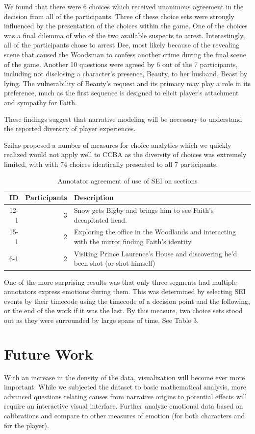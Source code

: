 We found that there were 6 choices which received unanimous agreement
in the decision from all of the participants. Three of these choice
sets were strongly influenced by the presentation of the choices
within the game. One of the choices was a final dilemma of who of the
two available suspects to arrest. Interestingly, all of the
participants chose to arrest Dee, most likely because of the revealing
scene that caused the Woodsman to confess another crime during the
final scene of the game. Another 10 questions were agreed by 6 out of
the 7 participants, including not disclosing a character’s presence,
Beauty, to her husband, Beast by lying. The vulnerability of Beauty’s
request and its primacy may play a role in its preference, much as the
first sequence is designed to elicit player’s attachment and sympathy
for Faith.

These findings suggest that narrative modeling will be necessary to
understand the reported diversity of player experiences.

Szilas proposed a number of measures for choice analytics
\cite{Szilas2014-fd} which we quickly realized would not apply well to
CCBA as the diversity of choices was extremely limited, with with 74
choices identically presented to all 7 participants.

\begin{table}[htb]
\caption{Annotator agreement of use of SEI on sections}
\centering
\begin{tabular}{rrl}
ID & Participants & Description\\
\hline
12-1 & 3 & Snow gets Bigby and brings him to see Faith's decapitated head.\\
15-1 & 2 & Exploring the office in the Woodlands and interacting with the mirror finding Faith's identity\\
6-1 & 2 & Visiting Prince Laurence's House and discovering he'd been shot (or shot himself)\\
\end{tabular}
\end{table}

One of the more surprising results was that only three segments had
multiple annotators express emotions during them. This was determined
by selecting SEI events by their timecode using the timecode of a
decision point and the following, or the end of the work if it was the
last. By this measure, two choice sets stood out as they were
surrounded by large spans of time. See Table 3.
\section{Future Work}
\label{sec:orgheadline12}
With an increase in the density of the data, visualization will become
ever more important. While we subjected the dataset to basic
mathematical analysis, more advanced questions relating causes from
narrative origins to potential effects will require an interactive
visual interface. Further analyze emotional data based on calibrations
and compare to other measures of emotion (for both characters and for
the player).


